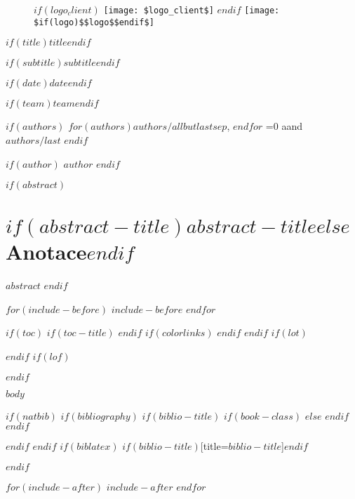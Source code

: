 \documentclass[12pt,a4paper,$for(classoption)$$classoption$$sep$,$endfor$]{$documentclass$}
\newcommand{\tr}[2]{\ifnum\pdfstrcmp{\languagename}{czech}=0 #1\else #2\fi}
\begin{document}
\begin{titlepage}
    \begin{center}

      \onehalfspacing

      \vspace*{1cm}

      \begin{figure}
      \centering
      $if(logo_client)$
      \texttt{[image: \$logo\_client\$]}%
      \hspace{1.5cm}%
      $endif$
      \texttt{[image: \$if(logo)\$\$logo\$\$endif\$]}%
      \end{figure}

      \vspace{1cm}

      \textbf{\huge $if(title)$$title$$endif$}

      \vspace{.25cm}

      \textit{\Large $if(subtitle)$$subtitle$$endif$}

      \vspace{1cm}

      \large

      $if(date)$$date$$endif$

      \vspace{1cm}

      $if(team)$$team$$endif$

      \vspace{.25cm}

      $if(authors)$
      $for(authors)$$authors/allbutlast$$sep$, $endfor$ \tr{a}{and}~$authors/last$
      $endif$

      $if(author)$
      $author$
      $endif$

      \vspace{1.5cm}

    \end{center}
\end{titlepage}


$if(abstract)$
\thispagestyle{empty}
\section*{$if(abstract-title)$$abstract-title$$else$Anotace$endif$}
$abstract$
$endif$

$for(include-before)$
$include-before$
$endfor$

$if(toc)$
{
$if(toc-title)$
\renewcommand*\contentsname{$toc-title$}
$endif$
$if(colorlinks)$
\hypersetup{linkcolor=$if(toccolor)$$toccolor$$else$black$endif$}
$endif$
\setcounter{tocdepth}{$toc-depth$}
\tableofcontents
}
$endif$
$if(lot)$
\listoftables
$endif$
$if(lof)$
\listoffigures
$endif$

$body$

$if(natbib)$
$if(bibliography)$
$if(biblio-title)$
$if(book-class)$
\renewcommand\bibname{$biblio-title$}
$else$
\renewcommand\refname{$biblio-title$}
$endif$
$endif$


$endif$
$endif$
$if(biblatex)$
\printbibliography$if(biblio-title)$[title=$biblio-title$]$endif$

$endif$

$for(include-after)$
$include-after$
$endfor$
\end{document}
